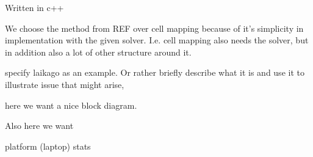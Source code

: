 Written in c++

We choose the method from REF over cell mapping because of it's simplicity in implementation with the given solver. 
I.e. cell mapping also needs the solver, but in addition also a lot of other structure around it. 

specify laikago as an example. Or rather briefly describe what it is and use it to illustrate issue that might arise, 

here we want a nice block diagram. 

Also here we want

platform (laptop) stats


